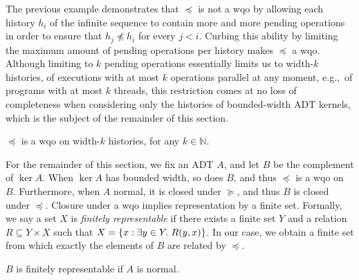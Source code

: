 The previous example demonstrates that $\preceq$ is not a wqo by allowing each
history $h_i$ of the infinite sequence to contain more and more pending
operations in order to ensure that $h_j \not\preceq h_i$ for every $j < i$.
Curbing this ability by limiting the maximum amount of pending operations per
history makes $\preceq$ a wqo. Although limiting to $k$ pending operations
essentially limits us to width-$k$ histories, of executions with at most $k$
operations parallel at any moment, e.g.,~of programs with at most $k$ threads,
this restriction comes at no loss of completeness when considering only the
histories of bounded-width ADT kernels, which is the subject of the remainder
of this section.

\begin{lemma}

  $\preceq$ is a wqo on width-$k$ histories, for any $k \in \mathbb{N}$.

\end{lemma}

For the remainder of this section, we fix an ADT $A$, and let $B$ be the
complement of $\ker A$. When $\ker A$ has bounded width, so does $B$, and thus
$\preceq$ is a wqo on $B$. Furthermore, when $A$ normal, it is closed under
$\succeq$, and thus $B$ is closed under $\preceq$. Closure under a wqo implies
representation by a finite set. Formally, we say a set $X$ is \emph{finitely
representable} if there exists a finite set $Y$ and a relation $R \subseteq Y
\times X$ such that $X = {\{{ x : \exists y\in Y.\ R(y,x) }\}}$. In our case, we
obtain a finite set from which exactly the elements of $B$ are related by
$\preceq$.

\begin{lemma}

  $B$ is finitely representable if $A$ is normal.

\end{lemma}

